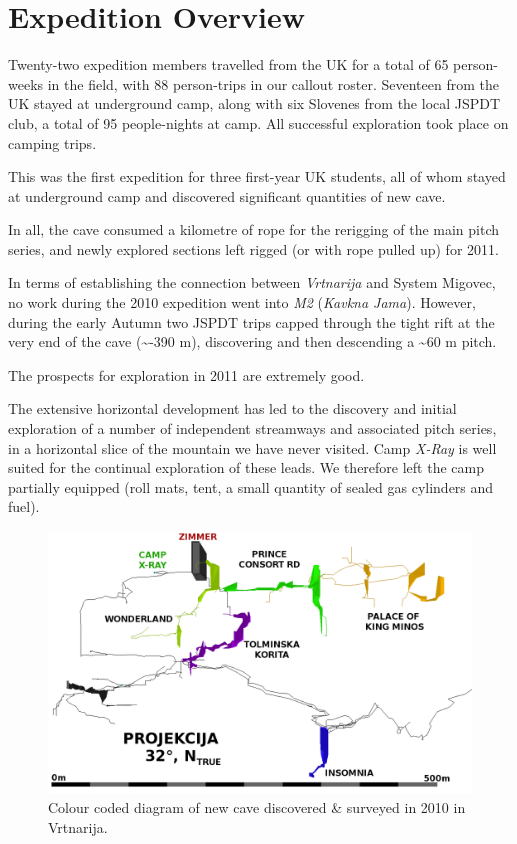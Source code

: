 \hypertarget{expedition-overview}{%
\section{Expedition Overview}\label{expedition-overview}}

Twenty-two expedition members travelled from the UK for a total of 65
person-weeks in the field, with 88 person-trips in our callout roster.
Seventeen from the UK stayed at underground camp, along with six
Slovenes from the local JSPDT club, a total of 95 people-nights at camp.
All successful exploration took place on camping trips.

This was the first expedition for three first-year UK students, all of
whom stayed at underground camp and discovered significant quantities of
new cave.

In all, the cave consumed a kilometre of rope for the rerigging of the
main pitch series, and newly explored sections left rigged (or with rope
pulled up) for 2011.

In terms of establishing the connection between \emph{Vrtnarija} and
System Migovec, no work during the 2010 expedition went into \emph{M2}
(\emph{Kavkna Jama}). However, during the early Autumn two JSPDT trips
capped through the tight rift at the very end of the cave
(\textasciitilde -390 m), discovering and then descending a
\textasciitilde 60 m pitch.

The prospects for exploration in 2011 are extremely good.

The extensive horizontal development has led to the discovery and
initial exploration of a number of independent streamways and associated
pitch series, in a horizontal slice of the mountain we have never
visited. Camp \emph{X-Ray} is well suited for the continual exploration
of these leads. We therefore left the camp partially equipped (roll
mats, tent, a small quantity of sealed gas cylinders and fuel).

\begin{figure}
\includegraphics[width=0.85\columnwidth]{2010/2010_deep_vrtnarija_colour_coded_inverted_labelled}
\caption{Colour coded diagram of new cave discovered \& surveyed in 2010 in
Vrtnarija.}
\end{figure}

